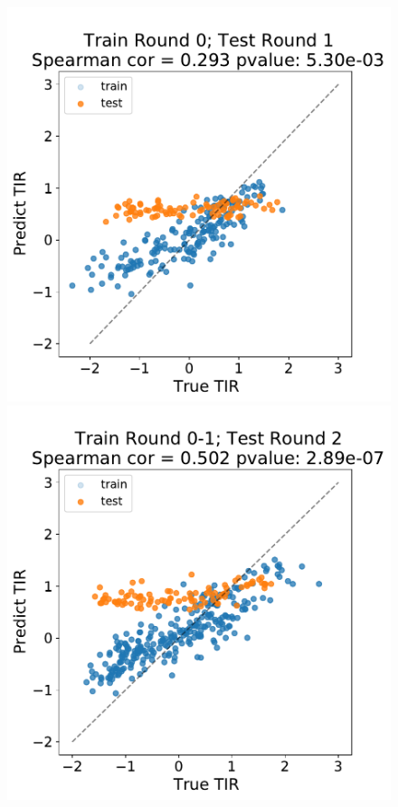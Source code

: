 \begin{figure}[!ht]
    \centering
    \includegraphics[scale = 0.35]{plots/Supplementary/scatter_bc1_TTF_0.pdf}
    \includegraphics[scale = 0.35]{plots/Supplementary/scatter_abc1_TT_1.pdf}

\end{figure}

